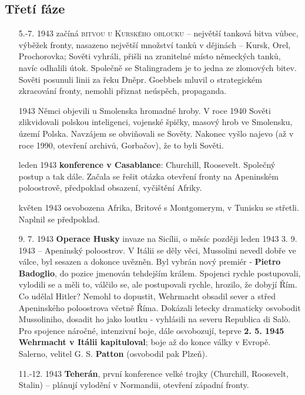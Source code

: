\documentclass{article}
\begin{document}
\subsection*{Třetí fáze}
\begin{itemize}
    \item[5.-7. 1943] začíná \textsc{bitvou u Kurského oblouku} -- největší tanková bitva vůbec, výběžek fronty, nasazeno největší množství tanků v dějinách -- Kursk, Orel, Prochorovka; Sověti vyhráli, přišli na zranitelné místo německých tanků, navíc odhalili útok. Společně se Stalingradem je to jedna ze zlomových bitev. Sověti posunuli linii za řeku Dněpr. Goebbels mluvil o strategickém zkracování fronty, nemohli přiznat neúspěch, propaganda.
    \item[1943] Němci objevili u Smolenska hromadné hroby. V roce 1940 Sověti zlikvidovali polskou inteligenci, vojenské špičky, masový hrob ve Smolensku, území Polska. Navzájem se obviňovali se Sověty. Nakonec vyšlo najevo (až v roce 1990, otevření archivů, Gorbačov), že to byli Sověti.
    \item[leden 1943] \textbf{konference v Casablance}: Churchill, Roosevelt. Společný postup a tak dále. Začala se řešit otázka otevření fronty na Apeninském poloostrově, předpoklad obsazení, vyčištění Afriky.
    \item[květen 1943] osvobozena Afrika, Britové s Montgomerym, v Tunisku se střetli. Naplnil se předpoklad.
    \item[9. 7. 1943] \textbf{Operace Husky} invaze na Sicílii, o měsíc později leden 1943 3. 9. 1943 -- Apeninský poloostrov. V Itálii se děly věci, Mussolini nevedl dobře ve válce, byl sesazen a dokonce uvězněn. Byl vybrán nový premiér - \textbf{Pietro Badoglio}, do pozice jmenován tehdejším králem. Spojenci rychle postupovali, vylodili se a měli to, válčilo se, ale postupovali rychle, hrozilo, že dobyjí Řím. Co udělal Hitler? Nemohl to dopustit, Wehrmacht obsadil sever a střed Apeninského poloostrova včetně Říma. Dokázali letecky dramaticky osvobodit Mussoliniho, dosadit ho jako loutku - vyhlásili na severu Republica di Salò. Pro spojence náročné, intenzivní boje, dále osvobozují, teprve \textbf{2. 5. 1945 Wehrmacht v Itálii kapituloval}; boje až do konce války v Evropě. Salerno, velitel G. S. \textbf{Patton} (osvobodil pak Plzeň).
    \item[11.-12. 1943] \textbf{Teherán}, první konference velké trojky (Churchill, Roosevelt, Stalin) -- plánují vylodění v Normandii, otevření západní fronty.
\end{itemize}
\end{document}
